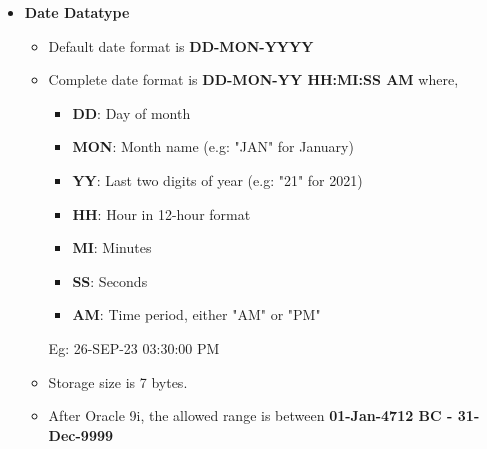 \begin{flushleft}
		\begin{itemize}
			\item \textbf{Date Datatype}		
			\begin{itemize}
				\item Default date format is \textbf{DD-MON-YYYY}
				\item Complete date format is \textbf{DD-MON-YY HH:MI:SS AM} where,
				\begin{itemize}
					\item \textbf{DD}: Day of month
					\item \textbf{MON}: Month name (e.g: "JAN" for January)
					\item \textbf{YY}: Last two digits of year (e.g: "21" for 2021)
					\item \textbf{HH}: Hour in 12-hour format
					\item \textbf{MI}: Minutes
					\item \textbf{SS}: Seconds
					\item \textbf{AM}: Time period, either "AM" or "PM"
				\end{itemize}
				Eg: 26-SEP-23 03:30:00 PM
				
				\item Storage size is 7 bytes.
				\item After Oracle 9i, the allowed range is between \textbf{01-Jan-4712 BC - 31-Dec-9999}
				

\end{itemize}
\end{itemize}
\end{flushleft}
